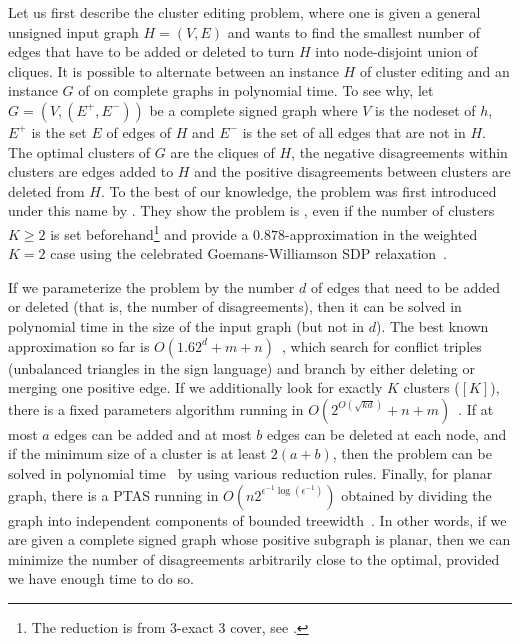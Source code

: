 Let us first describe the cluster editing problem, where one is given a general unsigned input graph
$H=(V,E)$ and wants to
find the smallest number of edges that have to be added or deleted to turn $H$ into node-disjoint
union of cliques. It is possible to alternate between an instance $H$ of cluster editing and an
instance $G$ of \pcc{} on complete graphs in polynomial time. To see why, let $G=(V,(E^+,E^-))$
be a complete signed graph where $V$ is the nodeset of $h$, $E^+$ is the set $E$ of edges of $H$ and
$E^-$ is the set of all
edges that are not in $H$. The optimal clusters of $G$ are the cliques of $H$, the negative
disagreements within clusters are edges added to $H$ and the positive disagreements between clusters
are deleted from $H$. To the best of our knowledge, the problem was first introduced under this
name by \textcite{Shamir02}. They show the problem is
\NPc{}, even if the number of clusters $K\geq2$ is set beforehand\footnote{The reduction is from
3-exact 3 cover, see \autocite[Theorems 1, 2 and Corollary 1]{Shamir02}.} and provide a
$0.878$-approximation in the weighted $K=2$ case using the celebrated Goemans-Williamson SDP
relaxation~\autocite{MaxCutSDP95}.

If we parameterize the problem by the number $d$ of edges that need to be added or deleted (that is,
the number of disagreements), then it can be solved in polynomial time in the size of the input
graph (but not in $d$). The best known approximation so far is
$O(1.62^d+m+n)$~\autocite{GoldenCE12}, which search for conflict triples (\ie unbalanced triangles
in the sign language) and branch by either deleting or merging one positive edge. If we additionally
look for exactly $K$ clusters (\ie \mind$[K]$), there is a fixed parameters algorithm running in
$O(2^{O(\sqrt{kd})}+n+m)$~\autocite{Fomin2014}. If at most $a$ edges can be added and at most $b$
edges can be deleted at each node, and if the minimum size of a cluster is at least $2(a+b)$, then
the problem can be solved in polynomial time~\autocite{Abu-Khzam2015} by using various reduction
rules. Finally, for planar graph, there is a PTAS%
running in $O(n2^{\epsilon^{-1}\log(\epsilon^{-1})})$ obtained by dividing the graph
into independent components of bounded treewidth~\autocite{PlanarCEPTAS17}. In other words, if we
are given a complete signed graph whose positive subgraph is planar, then we can minimize the number
of disagreements arbitrarily close to the optimal, provided we have enough time to do so.

